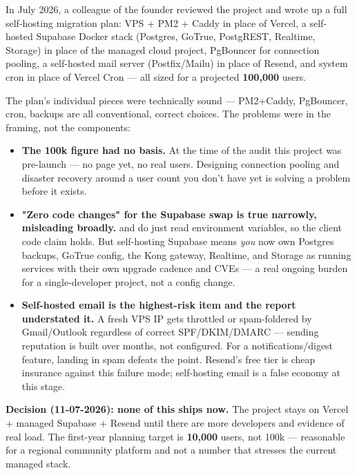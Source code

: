 In July 2026, a colleague of the founder reviewed the project and wrote up a full self-hosting migration plan: VPS + PM2 + Caddy in place of Vercel, a self-hosted Supabase Docker stack (Postgres, GoTrue, PostgREST, Realtime, Storage) in place of the managed cloud project, PgBouncer for connection pooling, a self-hosted mail server (Postfix/Mailu) in place of Resend, and system cron in place of Vercel Cron — all sized for a projected \textbf{100,000} users.

\begin{olknote}
The plan's individual pieces were technically sound — PM2+Caddy, PgBouncer, cron,  backups are all conventional, correct choices. The problems were in the framing, not the components:
\begin{itemize}
  \item \textbf{The 100k figure had no basis.} At the time of the audit this project was pre-launch — no  page yet, no real users. Designing connection pooling and disaster recovery around a user count you don't have yet is solving a problem before it exists.
  \item \textbf{"Zero code changes" for the Supabase swap is true narrowly, misleading broadly.}  and  do just read environment variables, so the client code claim holds. But self-hosting Supabase means \emph{you} now own Postgres backups, GoTrue config, the Kong gateway, Realtime, and Storage as running services with their own upgrade cadence and CVEs — a real ongoing burden for a single-developer project, not a config change.
  \item \textbf{Self-hosted email is the highest-risk item and the report understated it.} A fresh VPS IP gets throttled or spam-foldered by Gmail/Outlook regardless of correct SPF/DKIM/DMARC — sending reputation is built over months, not configured. For a notifications/digest feature, landing in spam defeats the point. Resend's free tier is cheap insurance against this failure mode; self-hosting email is a false economy at this stage.
\end{itemize}
\end{olknote}

\textbf{Decision (11-07-2026): none of this ships now.} The project stays on Vercel + managed Supabase + Resend until there are more developers and evidence of real load. The first-year planning target is \textbf{10,000} users, not 100k — reasonable for a regional community platform and not a number that stresses the current managed stack.

